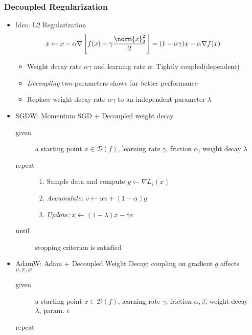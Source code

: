 \subsubsection*{Decoupled Regularization}
\begin{itemize}
    \item Idea: L2 Regularization
    \begin{equation}
        x\leftarrow x-\alpha\nabla\left[f(x)+\gamma\frac{\norm{x}_2^2}{2}\right]=(1-\alpha\gamma)x-\alpha\nabla f(x)
    \end{equation}
    \begin{itemize}
        \item Weight decay rate $\alpha\gamma$ and learning rate $\alpha$: Tightly coupled(dependent)
        \item \textit{Decoupling} two parameters shows far better performance
        \item Replace weight decay rate $\alpha\gamma$ to an independent parameter $\lambda$
    \end{itemize}
    \item SGDW: Momentum SGD + Decoupled weight decay
    \begin{description}
        \item[given] a starting point $x\in\mathcal{D}(f)$, learning rate $\gamma$, friction $\alpha$, weight decay $\lambda$
        \item[repeat] \phantom{}
        \begin{enumerate}
            \item Sample data and compute $g\leftarrow\nabla L_i(x)$
            \item \textit{Accumulate:} $v\leftarrow\alpha v+(1-\alpha)g$
            \item \textit{Update:} $x\leftarrow (1-\lambda)x-\gamma v$
        \end{enumerate}
        \item[until] stopping criterion is satisfied
    \end{description}
    \item AdamW: Adam + Decoupled Weight Decay; coupling on gradient $g$ affects $v,r,x$
    \begin{description}
        \item[given] a starting point $x\in\mathcal{D}(f)$, learning rate $\gamma$, friction $\alpha,\beta$, weight decay $\lambda$, param. $\varepsilon$
        \item[repeat] \phantom{}
        \begin{enumerate}

\end{enumerate}
\end{description}
\end{itemize}
